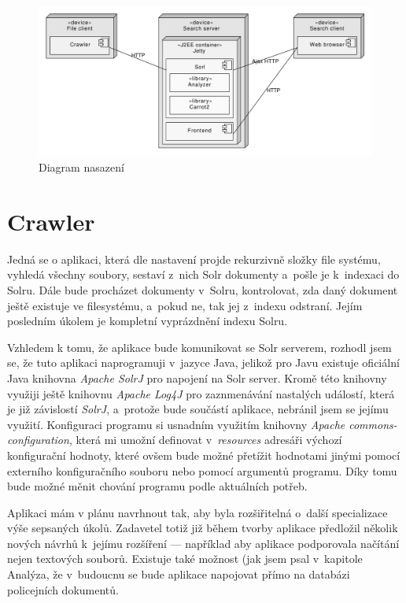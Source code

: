 \begin{figure}[h]
\begin{center}
\includegraphics[width=13cm]{Architecture}
\caption{Diagram nasazení}
\label{fig:Architecture}
\end{center}
\end{figure}

\section{Crawler}
Jedná se o aplikaci, která dle nastavení projde rekurzivně složky file systému, vyhledá všechny soubory, sestaví z~nich Solr dokumenty a~pošle je k~indexaci do Solru. Dále bude procházet dokumenty v~Solru, kontrolovat, zda daný dokument ještě existuje ve filesystému, a~pokud ne, tak jej z~indexu odstraní. Jejím posledním úkolem je kompletní vyprázdnění indexu Solru.

Vzhledem k tomu, že aplikace bude komunikovat se Solr serverem, rozhodl jsem se, že tuto aplikaci naprogramuji v~jazyce Java, jelikož pro Javu existuje oficiální Java knihovna \emph{Apache SolrJ} pro napojení na Solr server. Kromě této knihovny využiji ještě knihovnu \emph{Apache Log4J} pro zaznmenávání nastalých událostí, která je již závislostí \emph{SolrJ}, a~protože bude součástí aplikace, nebránil jsem se jejímu využití. Konfiguraci programu si usnadním využitím knihovny \emph{Apache commons-configuration}, která mi umožní definovat v~\emph{resources} adresáři výchozí konfigurační hodnoty, které ovšem bude možné přetížit hodnotami jinými pomocí externího konfiguračního souboru nebo pomocí argumentů programu. Díky tomu bude možné měnit chování programu podle aktuálních potřeb.

Aplikaci mám v plánu navrhnout tak, aby byla rozšiřitelná o~další specializace výše sepsaných úkolů. Zadavetel totiž již během tvorby aplikace předložil několik nových návrhů k~jejímu rozšíření — například aby aplikace podporovala načítání nejen textových souborů. Existuje také možnost (jak jsem psal v~kapitole Analýza, že v~budoucnu se bude aplikace napojovat přímo na databázi policejních dokumentů.

